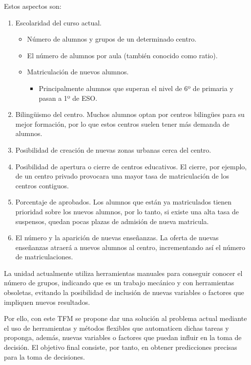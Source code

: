 Estos aspectos son:
\begin{enumerate}
	\item Escolaridad del curso actual.
	\begin{itemize}
		\item Número de alumnos y grupos de un determinado centro.
		\item El número de alumnos por aula (también conocido como ratio).
		\item Matriculación de nuevos alumnos.
		\begin{itemize}
			\item Principalmente alumnos que superan el nivel de 6º de primaria y pasan a 1º de ESO.
		\end{itemize}
	\end{itemize}
	
	\item Bilingüismo del centro. Muchos alumnos optan por centros bilingües para su mejor formación, por lo que estos centros suelen tener más demanda de alumnos.
	\item Posibilidad de creación de nuevas zonas urbanas cerca del centro. 
	\item Posibilidad de apertura o cierre de centros educativos. El cierre, por ejemplo, de un centro privado provocara una mayor tasa de matriculación de los centros contiguos. 
	\item Porcentaje de aprobados. Los alumnos que están ya matriculados tienen prioridad sobre los nuevos alumnos, por lo tanto, si existe una alta tasa de suspensos, quedan pocas plazas de admisión de nueva matricula.
	\item El número y la aparición de nuevas enseñanzas. La oferta de nuevas enseñanzas atraerá a nuevos alumnos al centro, incrementando así el número de matriculaciones.
\end{enumerate}

La unidad actualmente utiliza herramientas manuales para conseguir conocer el número de grupos, indicando que es un trabajo mecánico y con herramientas obsoletas, evitando la posibilidad de inclusión de nuevas variables o factores que impliquen nuevos resultados.

Por ello, con este TFM se propone dar una solución al problema actual mediante el uso de herramientas y métodos flexibles que automaticen dichas tareas y proponga, además, nuevas variables o factores que puedan influir en la toma de decisión. El objetivo final consiste, por tanto, en obtener predicciones precisas para la toma de decisiones. 

